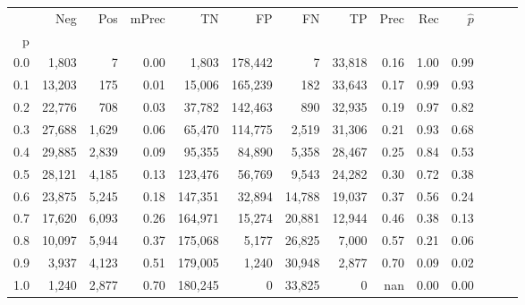 \begin{tabular}{rrrrrrrrrrrrrr}
\toprule
{} &     Neg &    Pos & mPrec &       TN &       FP &      FN &      TP &  Prec &   Rec & $\hat{p}$ \\
p   &         &        &       &          &          &         &         &       &       &           \\
\midrule
0.0 &   1,803 &      7 &  0.00 &    1,803 &  178,442 &       7 &  33,818 &  0.16 &  1.00 &      0.99 \\
0.1 &  13,203 &    175 &  0.01 &   15,006 &  165,239 &     182 &  33,643 &  0.17 &  0.99 &      0.93 \\
0.2 &  22,776 &    708 &  0.03 &   37,782 &  142,463 &     890 &  32,935 &  0.19 &  0.97 &      0.82 \\
0.3 &  27,688 &  1,629 &  0.06 &   65,470 &  114,775 &   2,519 &  31,306 &  0.21 &  0.93 &      0.68 \\
0.4 &  29,885 &  2,839 &  0.09 &   95,355 &   84,890 &   5,358 &  28,467 &  0.25 &  0.84 &      0.53 \\
0.5 &  28,121 &  4,185 &  0.13 &  123,476 &   56,769 &   9,543 &  24,282 &  0.30 &  0.72 &      0.38 \\
0.6 &  23,875 &  5,245 &  0.18 &  147,351 &   32,894 &  14,788 &  19,037 &  0.37 &  0.56 &      0.24 \\
0.7 &  17,620 &  6,093 &  0.26 &  164,971 &   15,274 &  20,881 &  12,944 &  0.46 &  0.38 &      0.13 \\
0.8 &  10,097 &  5,944 &  0.37 &  175,068 &    5,177 &  26,825 &   7,000 &  0.57 &  0.21 &      0.06 \\
0.9 &   3,937 &  4,123 &  0.51 &  179,005 &    1,240 &  30,948 &   2,877 &  0.70 &  0.09 &      0.02 \\
1.0 &   1,240 &  2,877 &  0.70 &  180,245 &        0 &  33,825 &       0 &   nan &  0.00 &      0.00 \\
\bottomrule
\end{tabular}
